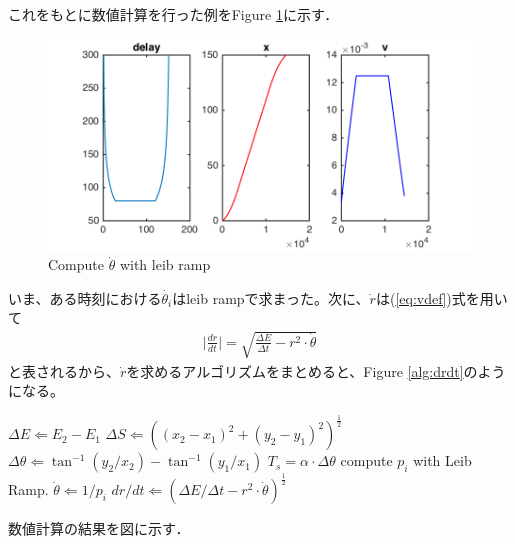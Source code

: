 \documentclass[twocolumn,oneside,a4paper]{article}
\begin{document}
これをもとに数値計算を行った例をFigure \ref{fig:leib_ramp_result}に示す．

\begin{figure}[htbp]
    \includegraphics[bb=0 0 432 216,width=1\columnwidth]{leib_ramp_screenshot.png}
    \caption{Compute $\dot{\theta}$ with leib ramp}
    \label{fig:leib_ramp_result}
\end{figure}

いま、ある時刻における$\dot{\theta_i}$はleib rampで求まった。次に、$\dot r$は(\ref{eq:vdef})式を用いて
\begin{eqnarray}
	\bigg|\frac{dr}{dt}\bigg| = \sqrt{\frac{\Delta E}{\Delta t} - r^2 \cdot \dot \theta}
\end{eqnarray}
と表されるから、$\dot r$を求めるアルゴリズムをまとめると、Figure \ref{alg:drdt}のようになる。

\begin{algorithm}[htbp]                  
\begin{algorithmic}                  
\label{alg:drdt}                          
\STATE $\Delta E \Leftarrow E_2-E_1$
\STATE $\Delta S \Leftarrow ((x_2-x_1)^2 + (y_2-y_1)^2)^{\frac{1}{2}}$
\STATE $\Delta \theta \Leftarrow \tan^{-1} (y_2/x_2) - \tan^{-1} (y_1/x_1)$
\STATE $T_s = \alpha \cdot \Delta \theta$
\STATE compute $p_i$ with Leib Ramp.
\STATE $\dot \theta \Leftarrow 1 / p_i $ 
\STATE $dr/dt \Leftarrow (\Delta E/\Delta t-r^2 \cdot \dot \theta)^{\frac{1}{2}}$
\end{algorithmic}
\end{algorithm}
\vspace{-0.7cm}
\vspace{0.3cm}

数値計算の結果を図に示す．
\end{document}
